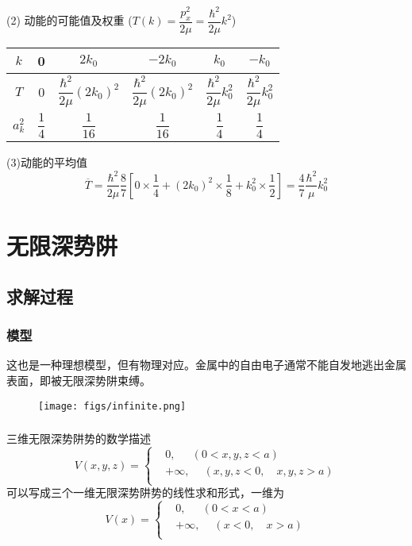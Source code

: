 \begin{frame}[label=current]
  \frametitle{}
(2) 动能的可能值及权重 ($T(k)= \dfrac{p^2_x}{2\mu} = \dfrac{\hbar^2}{2\mu} k^2 $)
\begin{table}[htbp]
  \centering\begin{tabular}{c|c|c|c|c|c}
    $k$ & 0 & $2k_0$ & $-2k_0$ & $k_0$& $-k_0$ \\
    \hline
    $T$& 0 & $\dfrac{\hbar^2}{2\mu} (2k_0)^2 $ & $\dfrac{\hbar^2}{2\mu} (2k_0)^2 $ & $\dfrac{\hbar^2}{2\mu} k_0^2 $& $\dfrac{\hbar^2}{2\mu} k_0^2 $ \\
    \hline
    $a^2_k$ & $\dfrac{1}{4} $ & $\dfrac{1}{16} $ & $\dfrac{1}{16} $ & $\dfrac{1}{4} $& $\dfrac{1}{4}$ \\
  \end{tabular} 
\end{table} 
(3)动能的平均值
\[ \overline{T} = \dfrac{\hbar^2}{2\mu} \frac{8}{7} \left[ 0 \times \dfrac{1}{4} + (2k_0)^2 \times \dfrac{1}{8}  + k_0^2 \times \dfrac{1}{2} \right]= \dfrac{4}{7}\dfrac{\hbar^2}{\mu}k_0^2 \]
\end{frame} 

\section{无限深势阱}
\subsection{求解过程}
\begin{frame}
  \frametitle{模型}
  这也是一种理想模型，但有物理对应。金属中的自由电子通常不能自发地逃出金属表面，即被无限深势阱束缚。
\begin{figure}[htbp]
    \centering
    \texttt{[image: figs/infinite.png]}
\end{figure}
\end{frame} 

\begin{frame}
  \frametitle{}
  三维无限深势阱势的数学描述
  $$ \displaystyle 
      V(x,y,z)=\left\{ 
      \begin{aligned}
          &0, ~~\quad (0 < x,y,z < a) \\  
          &+\infty,\quad~ ( x,y,z < 0, \quad x,y,z > a)\\
      \end{aligned}
      \right.
  $$
  可以写成三个一维无限深势阱势的线性求和形式，一维为
  $$ \displaystyle 
      V(x)=\left\{ 
      \begin{aligned}
          &0, ~~\quad (0 < x < a) \\  
          &+\infty,\quad~ ( x < 0, \quad x > a)\\
      \end{aligned}
      \right.
  $$
\end{frame} 

